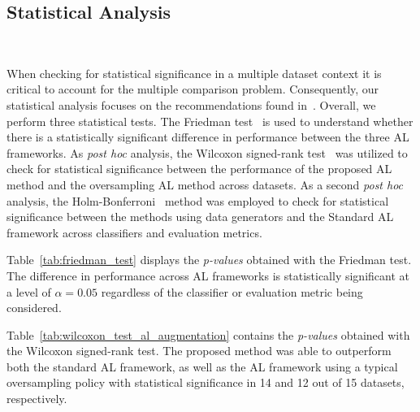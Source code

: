 \subsection{Statistical Analysis}~\label{sec:statistical-analysis-al-aug}

When checking for statistical significance in a multiple dataset context it is
critical to account for the multiple comparison problem. Consequently, our
statistical analysis focuses on the recommendations found
in~\cite{Demsar2006}. Overall, we perform three statistical tests. The Friedman
test~\cite{Friedman1937} is used to understand whether there is a
statistically significant difference in performance between the three AL
frameworks. As \textit{post hoc} analysis, the Wilcoxon signed-rank
test~\cite{Wilcoxon1945} was utilized to check for statistical significance
between the performance of the proposed AL method and the oversampling AL
method across datasets. As a second \textit{post hoc} analysis, the
Holm-Bonferroni~\cite{Holm1979} method was employed to check for statistical
significance between the methods using data generators and the Standard AL
framework across classifiers and evaluation metrics.
 
Table~\ref{tab:friedman_test} displays the \textit{p-values} obtained with the
Friedman test. The difference in performance across AL frameworks is
statistically significant at a level of $\alpha = 0.05$ regardless of the
classifier or evaluation metric being considered.

\begin{table}
	\centering
    \caption[Friedman test results.]{%
        Friedman test results. Statistical significance is tested at a
        level of $\alpha = 0.05$. The null hypothesis is that there is no
        difference in the classification outcome across oversamplers.
    }\label{tab:friedman_test}
\end{table}

Table~\ref{tab:wilcoxon_test_al_augmentation} contains the \textit{p-values} obtained with the
Wilcoxon signed-rank test. The proposed method was able to outperform both the
standard AL framework, as well as the AL framework using a typical
oversampling policy with statistical significance in 14 and 12 out of 15
datasets, respectively.


